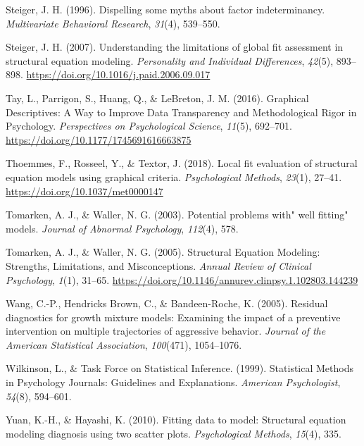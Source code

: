 \documentclass[
  english,
  doc]{apa6}
\newlength{\cslhangindent}
\newenvironment{cslreferences}%
  {\setlength{\parindent}{0pt}%
  \everypar{\setlength{\hangindent}{\cslhangindent}}\ignorespaces}%
  {\par}
\begin{document}
\begin{cslreferences}
\leavevmode\hypertarget{ref-steiger1996dispelling}{}%
Steiger, J. H. (1996). Dispelling some myths about factor indeterminancy. \emph{Multivariate Behavioral Research}, \emph{31}(4), 539--550.

\leavevmode\hypertarget{ref-Steiger2007}{}%
Steiger, J. H. (2007). Understanding the limitations of global fit assessment in structural equation modeling. \emph{Personality and Individual Differences}, \emph{42}(5), 893--898. \url{https://doi.org/10.1016/j.paid.2006.09.017}

\leavevmode\hypertarget{ref-Tay2016a}{}%
Tay, L., Parrigon, S., Huang, Q., \& LeBreton, J. M. (2016). Graphical Descriptives: A Way to Improve Data Transparency and Methodological Rigor in Psychology. \emph{Perspectives on Psychological Science}, \emph{11}(5), 692--701. \url{https://doi.org/10.1177/1745691616663875}

\leavevmode\hypertarget{ref-Thoemmes2018}{}%
Thoemmes, F., Rosseel, Y., \& Textor, J. (2018). Local fit evaluation of structural equation models using graphical criteria. \emph{Psychological Methods}, \emph{23}(1), 27--41. \url{https://doi.org/10.1037/met0000147}

\leavevmode\hypertarget{ref-tomarken2003potential}{}%
Tomarken, A. J., \& Waller, N. G. (2003). Potential problems with" well fitting" models. \emph{Journal of Abnormal Psychology}, \emph{112}(4), 578.

\leavevmode\hypertarget{ref-Tomarken2005}{}%
Tomarken, A. J., \& Waller, N. G. (2005). Structural Equation Modeling: Strengths, Limitations, and Misconceptions. \emph{Annual Review of Clinical Psychology}, \emph{1}(1), 31--65. \url{https://doi.org/10.1146/annurev.clinpsy.1.102803.144239}

\leavevmode\hypertarget{ref-wang2005residual}{}%
Wang, C.-P., Hendricks Brown, C., \& Bandeen-Roche, K. (2005). Residual diagnostics for growth mixture models: Examining the impact of a preventive intervention on multiple trajectories of aggressive behavior. \emph{Journal of the American Statistical Association}, \emph{100}(471), 1054--1076.

\leavevmode\hypertarget{ref-Wilkinson1999a}{}%
Wilkinson, L., \& Task Force on Statistical Inference. (1999). Statistical Methods in Psychology Journals: Guidelines and Explanations. \emph{American Psychologist}, \emph{54}(8), 594--601.

\leavevmode\hypertarget{ref-yuan2010fitting}{}%
Yuan, K.-H., \& Hayashi, K. (2010). Fitting data to model: Structural equation modeling diagnosis using two scatter plots. \emph{Psychological Methods}, \emph{15}(4), 335.
\end{cslreferences}
\end{document}
